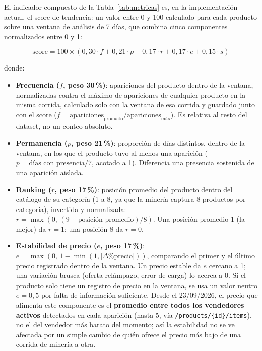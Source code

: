 El indicador compuesto de la Tabla~\ref{tab:metricas} es, en la implementación actual, el score de tendencia: un valor entre 0 y 100 calculado para cada producto sobre una ventana de análisis de 7 días, que combina cinco componentes normalizados entre 0 y 1:

\begin{equation}
	\text{score} = 100 \times (0{,}30 \cdot f + 0{,}21 \cdot p + 0{,}17 \cdot r + 0{,}17 \cdot e + 0{,}15 \cdot s)
	\label{eq:score}
\end{equation}

donde:

\begin{itemize}
	\item \textbf{Frecuencia ($f$, peso 30\,\%)}: apariciones del producto dentro de la ventana, normalizadas contra el máximo de apariciones de cualquier producto en la misma corrida, calculado solo con la ventana de esa corrida y guardado junto con el score ($f = \text{apariciones}_{\text{producto}} / \text{apariciones}_{\text{máx}}$). Es relativa al resto del dataset, no un conteo absoluto.
	\item \textbf{Permanencia ($p$, peso 21\,\%)}: proporción de días distintos, dentro de la ventana, en los que el producto tuvo al menos una aparición ($p = \text{días con presencia} / 7$, acotado a 1). Diferencia una presencia sostenida de una aparición aislada.
	\item \textbf{Ranking ($r$, peso 17\,\%)}: posición promedio del producto dentro del catálogo de su categoría (1 a 8, ya que la minería captura 8 productos por categoría), invertida y normalizada: $r = \max(0,\, (9 - \text{posición promedio}) / 8)$. Una posición promedio 1 (la mejor) da $r=1$; una posición 8 da $r=0$.
	\item \textbf{Estabilidad de precio ($e$, peso 17\,\%)}: $e = \max(0,\, 1 - \min(1, |\Delta\%\text{precio}|))$, comparando el primer y el último precio registrado dentro de la ventana. Un precio estable da $e$ cercano a 1; una variación brusca (oferta relámpago, error de carga) lo acerca a 0. Si el producto solo tiene un registro de precio en la ventana, se usa un valor neutro $e = 0{,}5$ por falta de información suficiente. Desde el 23/09/2026, el precio que alimenta este componente es el \textbf{promedio entre todos los vendedores activos} detectados en cada aparición (hasta 5, vía \texttt{/products/\{id\}/items}), no el del vendedor más barato del momento; así la estabilidad no se ve afectada por un simple cambio de quién ofrece el precio más bajo de una corrida de minería a otra.

\end{itemize}
